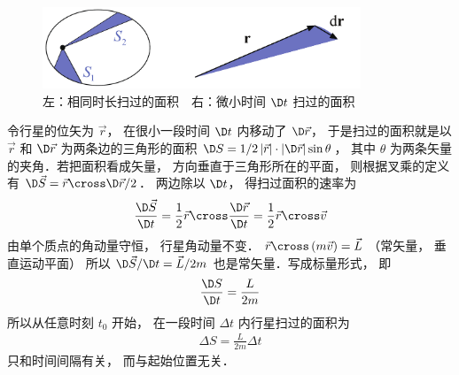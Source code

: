 
\begin{figure}[ht]
\centering
\includegraphics[width=9.5cm]{./figures/Keple21.pdf}
\caption{左：相同时长扫过的面积\ \ 右：微小时间 $\D t$ 扫过的面积} \label{Keple21}
\end{figure}

令行星的位矢为 $\vec r$，  在很小一段时间 $\D t$ 内移动了 $\D \vec r$，  于是扫过的面积就是以 $\vec r$ 和 $\D \vec r$ 为两条边的三角形的面积 $\D S = {1}/{2}\left| {\vec r} \right| \cdot \left| {\D \vec r} \right|\sin \theta $，  其中 $\theta $ 为两条矢量的夹角．若把面积看成矢量， 方向垂直于三角形所在的平面， 则根据叉乘的定义有 $\D \vec S = \vec r \cross \D \vec r/2$． 两边除以 $\D t$，  得扫过面积的速率为
\begin{equation}
  \frac{{\D\vec S}}{{\D t}} = \frac{1}{2}\vec r \cross \frac{{\D\vec r}}{{\D t}} = \frac 12 \vec r\cross \vec v
\end{equation}
由单个质点的角动量守恒， 行星角动量不变．
$\vec r \cross \left( {m\vec v} \right) = \vec L$ （常矢量， 垂直运动平面） 所以 ${{\D\vec S}}/{{\D t}} = {{\vec L}}/{{2m}}$ 也是常矢量．写成标量形式， 即
\begin{equation}
  \frac{{\D S}}{{\D t}} = \frac{L}{{2m}}
\end{equation}
所以从任意时刻 ${t_0}$ 开始， 在一段时间 $\Delta t$ 内行星扫过的面积为 
\begin{equation}
  \begin{aligned}
  \Delta S = \frac{L}{{2m}}\Delta t
  \end{aligned}
\end{equation}
只和时间间隔有关， 而与起始位置无关．

